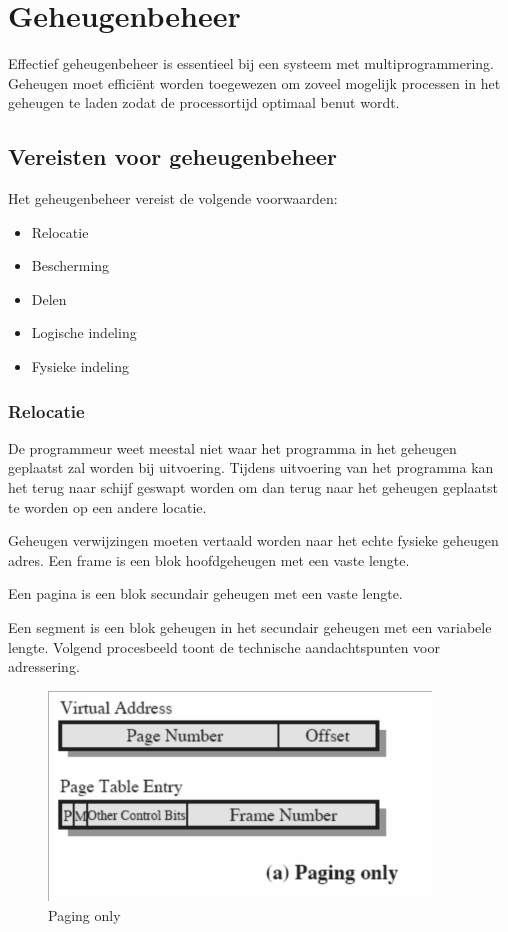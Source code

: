 \section{Geheugenbeheer}

Effectief geheugenbeheer is essentieel bij een systeem met multiprogrammering. Geheugen moet efficiënt worden toegewezen om zoveel mogelijk processen in het geheugen te laden zodat de processortijd optimaal benut wordt.

\subsection{Vereisten voor geheugenbeheer}

Het geheugenbeheer vereist de volgende voorwaarden:

\begin{multicols}{2}
\begin{itemize}
\item Relocatie
\item Bescherming
\item Delen
\item Logische indeling
\item Fysieke indeling
\end{itemize}
\end{multicols}

\subsubsection{Relocatie}

De programmeur weet meestal niet waar het programma in het geheugen geplaatst zal worden bij uitvoering. Tijdens uitvoering van het programma kan het terug naar schijf geswapt worden om dan terug naar het geheugen geplaatst te worden op een andere locatie.

Geheugen verwijzingen moeten vertaald worden naar het echte fysieke geheugen adres. Een frame is een blok hoofdgeheugen met een vaste lengte.

Een pagina is een blok secundair geheugen met een vaste lengte.

Een segment is een blok geheugen in het secundair geheugen met een variabele lengte. Volgend procesbeeld toont de technische aandachtspunten voor adressering.



\begin{figure}[htp]
    \centering
            \includegraphics[width=4in]{img/pagineren.png}
        \caption{Paging only}
    \label{fig:Paging only}
\end{figure}


